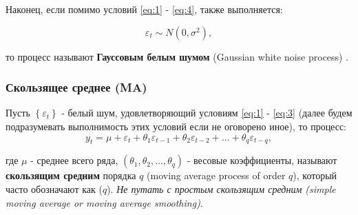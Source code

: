 Наконец, если помимо условий \eqref{eq:1} - \eqref{eq:4}, также выполняется:

\begin{equation*}
    \varepsilon_t \sim N(0, \sigma^2),
\end{equation*}

то процесс называют \textbf{Гауссовым белым шумом} (Gaussian white noise 
process) \cite{TSA_Hamilton}.





\subsubsection{Скользящее среднее (MA)}

Пусть $\left\{ \varepsilon_t \right\}$ - белый шум, удовлетворяющий условиям 
\eqref{eq:1} - \eqref{eq:3} (далее будем подразумевать выполнимость этих 
условий если не оговорено иное), то процесс:
\begin{equation*}
    y_t = \mu + \varepsilon_t + \theta_1 \varepsilon_{t-1} + 
    \theta_2 \varepsilon_{t-2} + ... + \theta_q \varepsilon_{t-q},
\end{equation*}

где $\mu$ - среднее всего ряда, $(\theta_1, \theta_2, ..., \theta_q)$ - 
весовые коэффициенты, называют \textbf{скользящим средним} порядка $q$ 
(moving average process of order $q$), который часто 
обозначают как ($q$). \textit{Не путать с простым 
скользящим средним (simple moving average or moving average smoothing)}.

